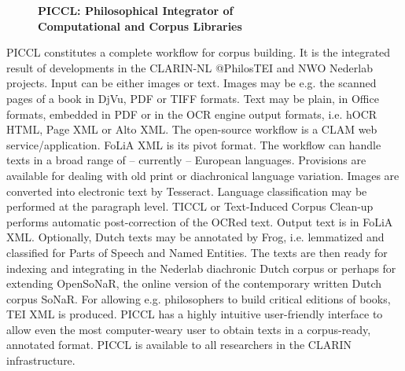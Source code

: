 \documentclass[10pt, a4paper, twopage, headinclude, footinclude, BCOR5mm]{scrartcl}
\begin{document}
\newpage

\begin{figure}[t!]
\centering
\large\textbf{PICCL: Philosophical Integrator of \\ Computational and Corpus Libraries}
\vspace*{0.5cm}
\end{figure}


        \begin{table}[t!]
    \end{table}

\noindent
PICCL constitutes a complete workflow for corpus building. It is the integrated result of developments in the CLARIN-NL @PhilosTEI and NWO Nederlab projects.  Input can be either images or text. Images may be e.g. the scanned pages of a book in DjVu, PDF or TIFF formats. Text may be plain, in Office formats, embedded in PDF or in the OCR engine output formats, i.e. hOCR HTML, Page XML or Alto XML.  The open-source workflow is a CLAM web service/application. FoLiA XML is its pivot format.  The workflow can handle texts in a broad range of -- currently -- European languages. Provisions are available for dealing with old print or diachronical language variation.  Images are converted into electronic text by Tesseract. Language classification may be performed at the paragraph level. TICCL or Text-Induced Corpus Clean-up performs automatic post-correction of the OCRed text.   Output text is in FoLiA XML. Optionally, Dutch texts may be annotated by Frog, i.e. lemmatized and classified for Parts of Speech and Named Entities. The texts are then ready for indexing and integrating in the Nederlab diachronic Dutch corpus or perhaps for extending OpenSoNaR, the online version of the contemporary written Dutch corpus SoNaR. For allowing e.g. philosophers to build critical editions of books, TEI XML is produced.  PICCL has a highly intuitive user-friendly interface to allow even the most computer-weary user to obtain texts in a corpus-ready, annotated format.   PICCL is available to all researchers in the CLARIN infrastructure.
\end{document}
